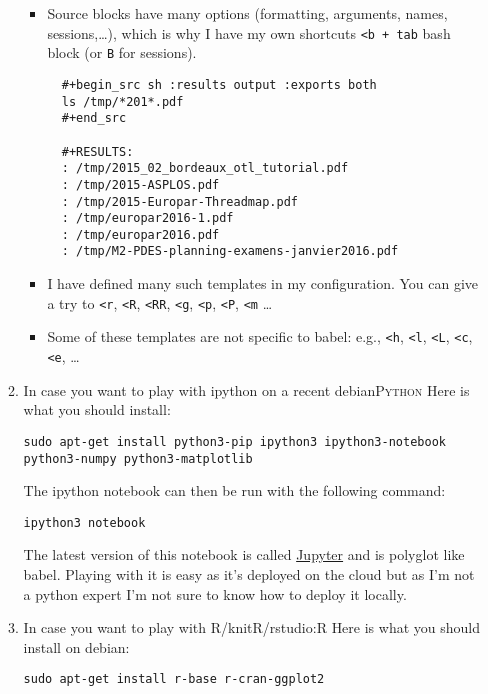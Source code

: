 \documentclass[11pt]{article}
\begin{document}
\begin{enumerate}
\begin{enumerate}
\begin{itemize}
\item Source blocks have many options (formatting, arguments, names,
sessions,\ldots{}), which is why I have my own shortcuts \texttt{<b + tab} bash
block (or \texttt{B} for sessions).
\begin{verbatim}
  #+begin_src sh :results output :exports both
  ls /tmp/*201*.pdf
  #+end_src

  #+RESULTS:
  : /tmp/2015_02_bordeaux_otl_tutorial.pdf
  : /tmp/2015-ASPLOS.pdf
  : /tmp/2015-Europar-Threadmap.pdf
  : /tmp/europar2016-1.pdf
  : /tmp/europar2016.pdf
  : /tmp/M2-PDES-planning-examens-janvier2016.pdf
\end{verbatim}
\item I have defined many such templates in my configuration. You can
give a try to \texttt{<r}, \texttt{<R}, \texttt{<RR}, \texttt{<g}, \texttt{<p}, \texttt{<P}, \texttt{<m} \ldots{}
\item Some of these templates are not specific to babel: e.g., \texttt{<h}, \texttt{<l},
\texttt{<L}, \texttt{<c}, \texttt{<e}, \ldots{}
\end{itemize}
\item In case you want to play with ipython on a recent debian\hfill{}\textsc{Python}
\label{sec:orgcd867a7}
Here is what you should install:
\begin{verbatim}
sudo apt-get install python3-pip ipython3 ipython3-notebook python3-numpy python3-matplotlib
\end{verbatim}

The ipython notebook can then be run with the following command:
\begin{verbatim}
ipython3 notebook
\end{verbatim}

The latest version of this notebook is called \href{http://jupyter.org/}{Jupyter} and is polyglot
like babel. Playing with it is easy as it's deployed on the cloud but
as I'm not a python expert I'm not sure to know how to deploy it locally.
\item In case you want to play with R/knitR/rstudio:\hfill{}\textsc{R}
\label{sec:org6b2e4f0}
Here is what you should install on debian:
\begin{verbatim}
sudo apt-get install r-base r-cran-ggplot2
\end{verbatim}


\end{enumerate}
\end{enumerate}
\end{document}
